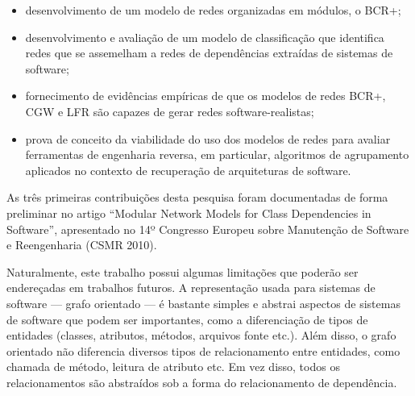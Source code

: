 \begin{itemize}
	\item desenvolvimento de um modelo de redes organizadas em módulos, o BCR+;
	\item desenvolvimento e avaliação de um modelo de classificação que identifica redes que se assemelham a redes de dependências extraídas de sistemas de software;
	\item fornecimento de evidências empíricas de que os modelos de redes BCR+, CGW e LFR são capazes de gerar redes software-realistas;
	\item prova de conceito da viabilidade do uso dos modelos de redes para avaliar ferramentas de engenharia reversa, em particular, algoritmos de agrupamento aplicados no contexto de recuperação de arquiteturas de software. 
\end{itemize}

As três primeiras contribuições desta pesquisa foram documentadas de forma preliminar no artigo ``Modular Network Models for Class Dependencies in Software'', apresentado no 14º Congresso Europeu sobre Manutenção de Software e Reengenharia (CSMR 2010). 


Naturalmente, este trabalho possui algumas limitações que poderão ser endereçadas em trabalhos futuros. A representação usada para sistemas de software --- grafo orientado --- é bastante simples e abstrai aspectos de sistemas de software que podem ser importantes, como a diferenciação de tipos de entidades (classes, atributos, métodos, arquivos fonte etc.). Além disso, o grafo orientado não diferencia diversos tipos de relacionamento entre entidades, como chamada de método, leitura de atributo etc. Em vez disso, todos os relacionamentos são abstraídos sob a forma do relacionamento de dependência.

